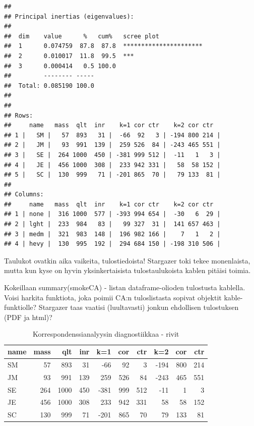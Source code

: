 \documentclass[
  finnish,
]{book}
\newenvironment{Shaded}{\begin{snugshade}}{\end{snugshade}}
\newcommand{\DataTypeTok}[1]{\textcolor[rgb]{0.13,0.29,0.53}{#1}}
\newcommand{\DecValTok}[1]{\textcolor[rgb]{0.00,0.00,0.81}{#1}}
\newcommand{\KeywordTok}[1]{\textcolor[rgb]{0.13,0.29,0.53}{\textbf{#1}}}
\newcommand{\NormalTok}[1]{#1}
\newcommand{\OperatorTok}[1]{\textcolor[rgb]{0.81,0.36,0.00}{\textbf{#1}}}
\newcommand{\OtherTok}[1]{\textcolor[rgb]{0.56,0.35,0.01}{#1}}
\newcommand{\StringTok}[1]{\textcolor[rgb]{0.31,0.60,0.02}{#1}}
\begin{document}
\begin{verbatim}
## 
## Principal inertias (eigenvalues):
## 
##  dim    value      %   cum%   scree plot               
##  1      0.074759  87.8  87.8  **********************   
##  2      0.010017  11.8  99.5  ***                      
##  3      0.000414   0.5 100.0                           
##         -------- -----                                 
##  Total: 0.085190 100.0                                 
## 
## 
## Rows:
##     name   mass  qlt  inr    k=1 cor ctr    k=2 cor ctr  
## 1 |   SM |   57  893   31 |  -66  92   3 | -194 800 214 |
## 2 |   JM |   93  991  139 |  259 526  84 | -243 465 551 |
## 3 |   SE |  264 1000  450 | -381 999 512 |  -11   1   3 |
## 4 |   JE |  456 1000  308 |  233 942 331 |   58  58 152 |
## 5 |   SC |  130  999   71 | -201 865  70 |   79 133  81 |
## 
## Columns:
##     name   mass  qlt  inr    k=1 cor ctr    k=2 cor ctr  
## 1 | none |  316 1000  577 | -393 994 654 |  -30   6  29 |
## 2 | lght |  233  984   83 |   99 327  31 |  141 657 463 |
## 3 | medm |  321  983  148 |  196 982 166 |    7   1   2 |
## 4 | hevy |  130  995  192 |  294 684 150 | -198 310 506 |
\end{verbatim}

Taulukot ovatkin aika vaikeita, tulostiedoista! Stargazer toki tekee monenlaista, mutta kun kyse on hyvin yksinkertaisista tulostaulukoista kablen pitäisi toimia.

Kokeillaan summary(smokeCA) - listan dataframe-olioden tulostusta kablella. Voisi harkita funktiota, joka poimii CA:n tuloslistasta sopivat objektit kable-funktiolle? Stargazer taas vaatisi (luultavasti) jonkun ehdollisen tulostuksen (PDF ja html)?

\begin{Shaded}
\end{Shaded}

\begin{table}

\caption{\label{tab:simpleCAtab1}Korrespondenssianalyysin diagnostiikkaa - rivit}
\centering
\begin{tabular}[t]{lrrrrrrrrr}
\toprule
name & mass &  qlt &  inr &  k=1 & cor & ctr &  k=2 & cor & ctr\\
\midrule
SM & 57 & 893 & 31 & -66 & 92 & 3 & -194 & 800 & 214\\
JM & 93 & 991 & 139 & 259 & 526 & 84 & -243 & 465 & 551\\
SE & 264 & 1000 & 450 & -381 & 999 & 512 & -11 & 1 & 3\\
JE & 456 & 1000 & 308 & 233 & 942 & 331 & 58 & 58 & 152\\
SC & 130 & 999 & 71 & -201 & 865 & 70 & 79 & 133 & 81\\
\bottomrule
\end{tabular}
\end{table}
\end{document}
